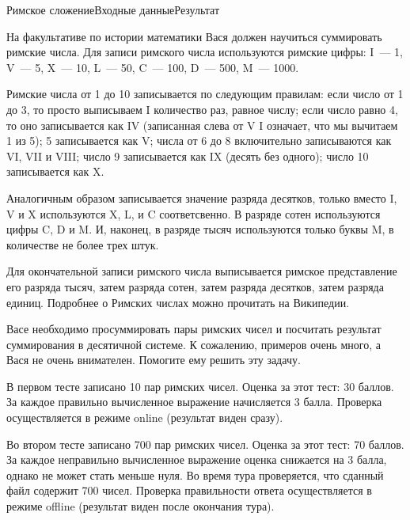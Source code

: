 \begin{problem}{Римское сложение}{Входные данные}{Результат}{}

На факультативе по истории математики Вася должен научиться суммировать римские числа. Для записи римского числа используются римские цифры: I~--- 1, V~--- 5, X~--- 10, L~--- 50, C~--- 100, D~--- 500, M~--- 1000.

Римские числа от 1 до 10 записывается по следующим правилам: если число от 1 до 3, то просто выписываем I количество раз, равное числу; если число равно 4, то оно записывается как IV (записанная слева от V I означает, что мы вычитаем 1 из 5); 5 записывается как V; числа от 6 до 8 включительно записываются как VI, VII и VIII; число 9 записывается как IX (десять без одного); число 10 записывается как X.

Аналогичным образом записывается значение разряда десятков, только вместо I, V и X используются X, L, и C соответсвенно. В разряде сотен используются цифры C, D и M. И, наконец, в разряде тысяч используются только буквы M, в количестве не более трех штук.

Для окончательной записи римского числа выписывается римское представление его разряда тысяч, затем разряда сотен, затем разряда десятков, затем разряда единиц. Подробнее о Римских числах можно прочитать на Википедии.

Васе необходимо просуммировать пары римских чисел и посчитать результат суммирования в десятичной системе. К сожалению, примеров очень много, а Вася не очень внимателен. Помогите ему решить эту задачу.

В первом тесте записано 10 пар римских чисел. Оценка за этот тест: 30 баллов. За каждое правильно вычисленное выражение начисляется 3 балла. Проверка осуществляется в режиме online (результат виден сразу).

Во втором тесте записано 700 пар римских чисел. Оценка за этот тест: 70 баллов. За каждое неправильно вычисленное выражение оценка снижается на 3 балла, однако не может стать меньше нуля. Во время тура проверяется, что сданный файл содержит 700 чисел. Проверка правильности ответа осуществляется в режиме offline (результат виден после окончания тура).

\Examples
\begin{example}
%
\end{example}

\end{problem}
